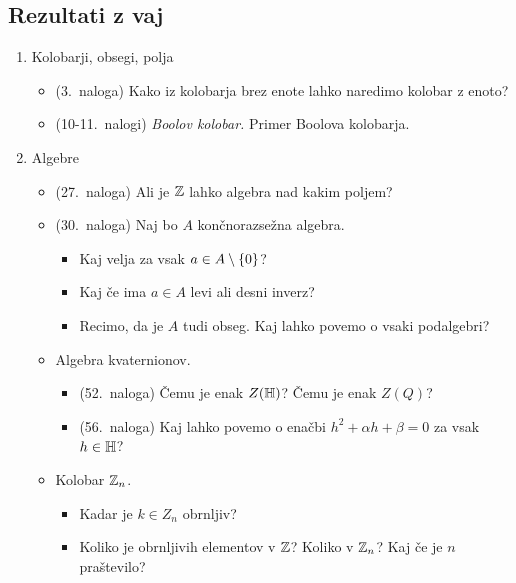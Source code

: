 \subsection*{Rezultati z vaj}
\begin{enumerate}
    \item Kolobarji, obsegi, polja
    \begin{itemize}
        \item (3.\ naloga) Kako iz kolobarja brez enote lahko naredimo kolobar z enoto?
        \item (10-11.\ nalogi) \emph{Boolov kolobar.} Primer Boolova kolobarja.
    \end{itemize}

    \item Algebre
    \begin{itemize}
        \item (27.\ naloga) Ali je $\mathbb{Z}$ lahko algebra nad kakim poljem?
        \item (30.\ naloga) Naj bo $A$ končnorazsežna algebra.    
        \begin{itemize}
            \item Kaj velja za vsak $a \in A \setminus \{0\}$?
            \item Kaj če ima $a \in A$ levi ali desni inverz?
            \item Recimo, da je $A$ tudi obseg. Kaj lahko povemo o vsaki podalgebri?
        \end{itemize}
        \item Algebra kvaternionov.
        \begin{itemize}
            \item (52.\ naloga) Čemu je enak $Z(\mathbb{H})$? Čemu je enak $Z(Q)$?
            \item (56.\ naloga) Kaj lahko povemo o enačbi $h^2 + \alpha h + \beta = 0$ za vsak $h \in \mathbb{H}$?
        \end{itemize}

        \item Kolobar $\mathbb{Z}_n$.
        \begin{itemize}
            \item Kadar je $k \in Z_n$ obrnljiv?
            \item Koliko je obrnljivih elementov v $\mathbb{Z}$? Koliko v $\mathbb{Z}_n$? Kaj če je $n$ praštevilo?
        \end{itemize}
    \end{itemize}
\end{enumerate}